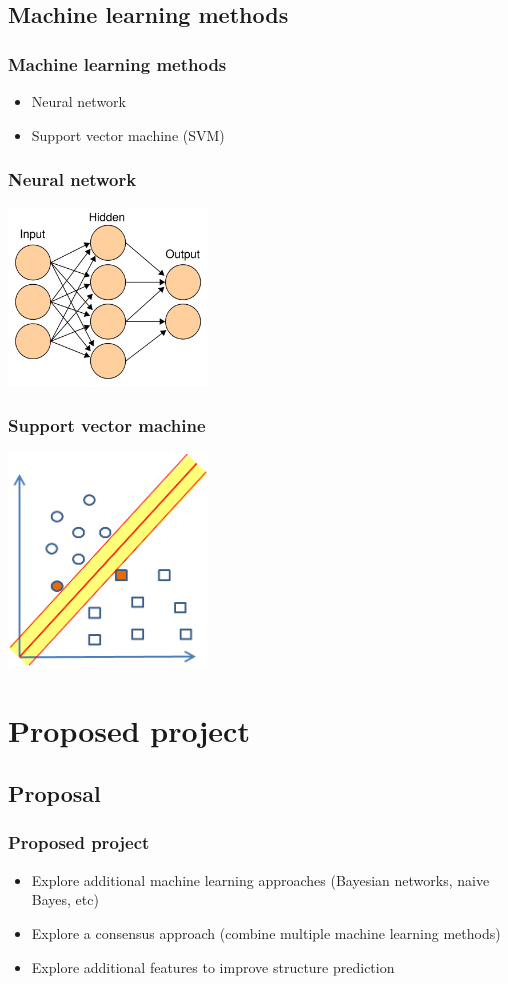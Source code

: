 \documentclass{beamer}
\begin{document}
\subsection{Machine learning methods}
\begin{frame}
  \frametitle{Machine learning methods}
  \begin{itemize}
    \item Neural network
    \item Support vector machine (SVM)
  \end{itemize}
\end{frame}
\begin{frame}
  \frametitle{Neural network}
  \begin{center}
    \includegraphics[width=200px]{neural-network.jpg}
  \end{center}
\end{frame}
\begin{frame}
  \frametitle{Support vector machine}
  \begin{center}
    \includegraphics[width=200px]{svm.png}
  \end{center}
\end{frame}

\section{Proposed project}
\subsection{Proposal}
\begin{frame}
  \frametitle{Proposed project}
  \begin{itemize}
    \item Explore additional machine learning approaches (Bayesian networks, naive Bayes, etc)
    \item Explore a consensus approach (combine multiple machine learning methods)
    \item Explore additional features to improve structure prediction
  \end{itemize}
\end{frame}
\end{document}
